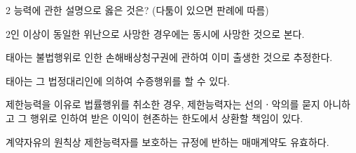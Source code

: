 \begin{question}{2}
능력에 관한 설명으로 옳은 것은? (다툼이 있으면 판례에 따름)
\begin{choices}
  \item 2인 이상이 동일한 위난으로 사망한 경우에는 동시에 사망한 것으로 본다.
  \item 태아는 불법행위로 인한 손해배상청구권에 관하여 이미 출생한 것으로 추정한다.
  \item 태아는 그 법정대리인에 의하여 수증행위를 할 수 있다.
  \item 제한능력을 이유로 법률행위를 취소한 경우, 제한능력자는 선의ㆍ악의를 묻지 아니하고 그 행위로 인하여 받은 이익이 현존하는 한도에서 상환할 책임이 있다.
  \item 계약자유의 원칙상 제한능력자를 보호하는 규정에 반하는 매매계약도 유효하다.
\end{choices}
\end{question}

